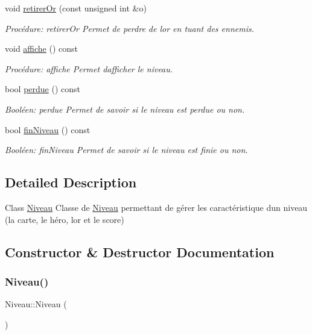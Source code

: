 \begin{DoxyCompactItemize}
void \hyperlink{classNiveau_a11f7ce4e0918a94d41c66459394cdd49}{retirer\+Or} (const unsigned int \&o)
\begin{DoxyCompactList}\small\item\em Procédure\+: retirer\+Or Permet de perdre de l\textquotesingle{}or en tuant des ennemis. \end{DoxyCompactList}\item 
void \hyperlink{classNiveau_ac0aff25fcdea980ff740344f58be0bbc}{affiche} () const
\begin{DoxyCompactList}\small\item\em Procédure\+: affiche Permet d\textquotesingle{}afficher le niveau. \end{DoxyCompactList}\item 
bool \hyperlink{classNiveau_ad1345f4f482fdd18213cab3b4cd8b8dc}{perdue} () const
\begin{DoxyCompactList}\small\item\em Booléen\+: perdue Permet de savoir si le niveau est perdue ou non. \end{DoxyCompactList}\item 
bool \hyperlink{classNiveau_aa94199eb0d75ab0d17c05272667e07a3}{fin\+Niveau} () const
\begin{DoxyCompactList}\small\item\em Booléen\+: fin\+Niveau Permet de savoir si le niveau est finie ou non. \end{DoxyCompactList}\end{DoxyCompactItemize}


\subsection{Detailed Description}
Class \hyperlink{classNiveau}{Niveau} Classe de \hyperlink{classNiveau}{Niveau} permettant de gérer les caractéristique d\textquotesingle{}un niveau (la carte, le héro, l\textquotesingle{}or et le score) 

\subsection{Constructor \& Destructor Documentation}
\mbox{\label{classNiveau_abf99be59a575d462a25c4ade5c124431}} 
\subsubsection{\texorpdfstring{Niveau()}{Niveau()}\hspace{0.1cm}{\footnotesize\ttfamily [1/2]}}
{\footnotesize\ttfamily Niveau\+::\+Niveau (\begin{DoxyParamCaption}{ }\end{DoxyParamCaption})}



